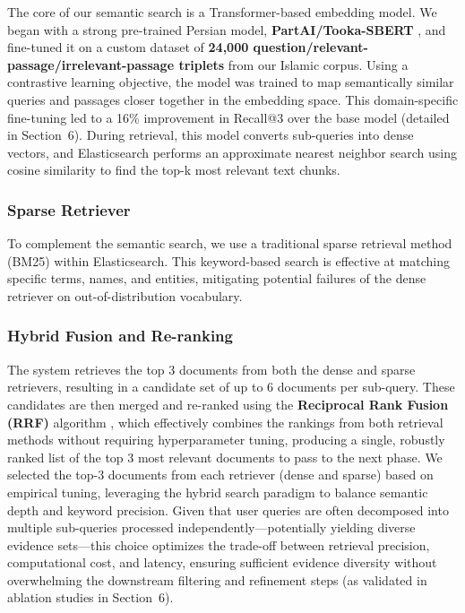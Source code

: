 \documentclass[11pt]{article}
\begin{document}
The core of our semantic search is a Transformer-based embedding model. We began with a strong pre-trained Persian model, \textbf{PartAI/Tooka-SBERT} \cite{PartAITooka}, and fine-tuned it on a custom dataset of \textbf{24,000 question/relevant-passage/irrelevant-passage triplets} from our Islamic corpus. Using a contrastive learning objective, the model was trained to map semantically similar queries and passages closer together in the embedding space. This domain-specific fine-tuning led to a 16\% improvement in Recall@3 over the base model (detailed in Section~6). During retrieval, this model converts sub-queries into dense vectors, and Elasticsearch performs an approximate nearest neighbor search using cosine similarity to find the top-k most relevant text chunks.

\subsubsection{Sparse Retriever}

To complement the semantic search, we use a traditional sparse retrieval method (BM25) within Elasticsearch. This keyword-based search is effective at matching specific terms, names, and entities, mitigating potential failures of the dense retriever on out-of-distribution vocabulary.

\subsubsection{Hybrid Fusion and Re-ranking}

The system retrieves the top 3 documents from both the dense and sparse retrievers, resulting in a candidate set of up to 6 documents per sub-query. These candidates are then merged and re-ranked using the \textbf{Reciprocal Rank Fusion (RRF)} algorithm \cite{cormack2009reciprocal}, which effectively combines the rankings from both retrieval methods without requiring hyperparameter tuning, producing a single, robustly ranked list of the top 3 most relevant documents to pass to the next phase. We selected the top-3 documents from each retriever (dense and sparse) based on empirical tuning, leveraging the hybrid search paradigm to balance semantic depth and keyword precision. Given that user queries are often decomposed into multiple sub-queries processed independently---potentially yielding diverse evidence sets---this choice optimizes the trade-off between retrieval precision, computational cost, and latency, ensuring sufficient evidence diversity without overwhelming the downstream filtering and refinement steps (as validated in ablation studies in Section~6).
\end{document}
